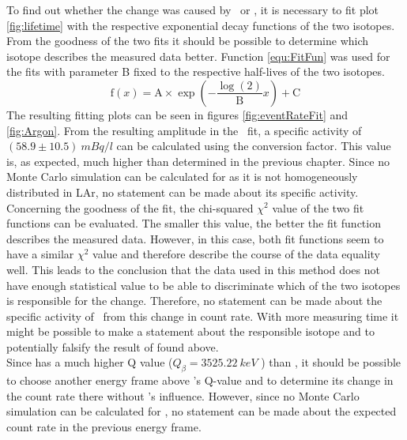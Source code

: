 \documentclass[encoding=utf8,british]{tumphthesis}
\begin{document}
To find out whether the change was caused by \Kr\ or , it is necessary to fit  plot \ref{fig:lifetime} with the respective exponential decay functions of the two isotopes.
From the goodness of the two fits it should be possible to determine which isotope describes the measured data better.
Function \ref{equ:FitFun} was used for the fits with parameter B fixed to the respective half-lives of the two isotopes.
\begin{equation}
\mathrm{f}(x) = \mathrm{A}\times\exp\left(-\frac{\log(2)}{\mathrm{B}} x \right) + \mathrm{C}
\label{equ:FitFun}
\end{equation}
The resulting fitting plots can be seen in figures \ref{fig:eventRateFit} and \ref{fig:Argon}.
From the resulting amplitude in the \Kr\ fit, a specific activity of $(58.9\pm10.5) \  \unit{mBq}/\unit{l}$ can be calculated using the conversion factor.
This value is, as expected, much higher than determined in the previous chapter.
Since no Monte Carlo simulation can be calculated for  as it is not homogeneously distributed in LAr, no statement can be made about its specific activity.
\\

Concerning the goodness of the fit, the chi-squared $\chi^2$ value of the two fit functions can be evaluated.
The smaller this value, the better the fit function describes  the measured data.
However, in this case, both fit functions seem to have a similar $\chi^2$ value and therefore describe the course of the data equality well.
This leads to the conclusion that the data used in this method does not have enough statistical value to be able to discriminate which of the two isotopes is responsible for the change.
Therefore, no statement can be made about the specific activity of \Kr\ from this change in count rate.
With more measuring time it might be possible to make a statement about the responsible isotope and to potentially falsify the result of found above.
\\

Since  has a much higher Q value ($Q_{\beta} = 3525.22 \ \unit{keV}$ \cite{chen_nuclear_2016}) than \Kr, it should be possible to choose another energy frame above \Kr's Q-value and to determine its change in the count rate there without \Kr's influence.
However, since no Monte Carlo simulation can be calculated for , no statement can be made about the expected count rate in the previous energy frame.
\end{document}
